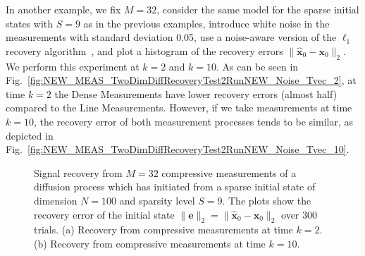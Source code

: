\documentclass[11pt,draftcls,onecolumn]{IEEEtran}
\newcommand{\vc}[1]{\boldsymbol{#1}}
\begin{document}
In another example, we fix $M = 32$, consider the same model for the sparse initial states with $S=9$ as in the previous examples, introduce white noise in the measurements with standard deviation 0.05, use a noise-aware version of the $\ell_1$ recovery algorithm~\cite{CandesRIP}, and plot a histogram of the recovery errors $\| \widehat{\vc{x}}_0 - \vc{x}_0\|_2$.
We perform this experiment at $k=2$ and $k=10$. As can be seen in Fig.~\ref{fig:NEW_MEAS_TwoDimDiffRecoveryTest2RunNEW_Noise_Tvec_2}, at time $k=2$ the Dense Measurements have lower recovery errors (almost half) compared to the Line Measurements. However, if we take measurements at time $k=10$, the recovery error of both measurement processes tends to be similar, as depicted in Fig.~\ref{fig:NEW_MEAS_TwoDimDiffRecoveryTest2RunNEW_Noise_Tvec_10}.

\begin{figure}[tb]
\centering
{}
\caption{
Signal recovery from $M=32$ compressive measurements of a diffusion process which has initiated from a sparse initial state of dimension $N = 100$ and sparsity level $S = 9$. The plots show the
recovery error of the initial state $\|\vc{e}\|_2 = \|\widehat{\vc{x}}_0 - \vc{x}_0\|_2$ over $300$ trials.
(a) Recovery from compressive measurements at time $k=2$. (b) Recovery from compressive measurements at time $k=10$.
}
\label{fig:NEW_MEAS_TwoDimDiffRecoveryTest2RunNEW_Noise}
\end{figure}
\end{document}
